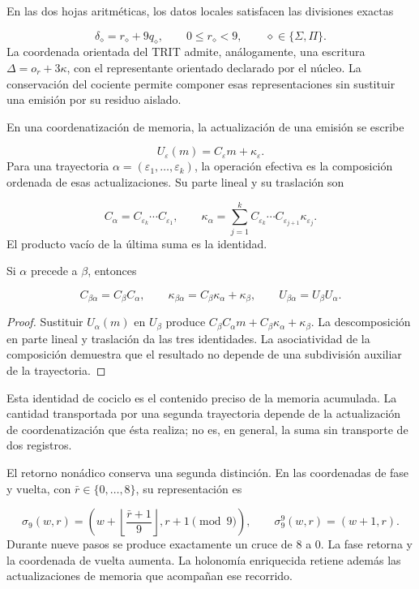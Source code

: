 En las dos hojas aritméticas, los datos locales satisfacen las divisiones exactas

\[
\delta_\diamond=r_\diamond+9q_\diamond,
\qquad 0\leq r_\diamond<9,
\qquad \diamond\in\{\Sigma,\Pi\}.
\]
La coordenada orientada del TRIT admite, análogamente, una escritura \(\Delta=o_r+3\kappa\), con el representante orientado declarado por el núcleo. La conservación del cociente permite componer esas representaciones sin sustituir una emisión por su residuo aislado.

En una coordenatización de memoria, la actualización de una emisión se escribe

\[
U_\varepsilon(m)=C_\varepsilon m+\kappa_\varepsilon.
\]
Para una trayectoria \(\alpha=(\varepsilon_1,\ldots,\varepsilon_k)\), la operación efectiva es la composición ordenada de esas actualizaciones. Su parte lineal y su traslación son

\[
C_\alpha=C_{\varepsilon_k}\cdots C_{\varepsilon_1},
\qquad
\kappa_\alpha=
\sum_{j=1}^{k}C_{\varepsilon_k}\cdots
C_{\varepsilon_{j+1}}\kappa_{\varepsilon_j}.
\]
El producto vacío de la última suma es la identidad.

\begin{proposition}
\label{prop:continuo-compatibilidad-afin}
Si \(\alpha\) precede a \(\beta\), entonces

\[
C_{\beta\alpha}=C_\beta C_\alpha,
\qquad
\kappa_{\beta\alpha}=C_\beta\kappa_\alpha+\kappa_\beta,
\qquad
U_{\beta\alpha}=U_\beta U_\alpha.
\]
\end{proposition}
\begin{proof}
Sustituir \(U_\alpha(m)\) en \(U_\beta\) produce \(C_\beta C_\alpha m+C_\beta\kappa_\alpha+\kappa_\beta\). La descomposición en parte lineal y traslación da las tres identidades. La asociatividad de la composición demuestra que el resultado no depende de una subdivisión auxiliar de la trayectoria.
\end{proof}

Esta identidad de cociclo es el contenido preciso de la memoria acumulada. La cantidad transportada por una segunda trayectoria depende de la actualización de coordenatización que ésta realiza; no es, en general, la suma sin transporte de dos registros.

El retorno nonádico conserva una segunda distinción. En las coordenadas de fase y vuelta, con \(\bar r\in\{0,\ldots,8\}\), su representación es

\[
\sigma_9(w,r)=
\left(w+\left\lfloor\frac{\bar r+1}{9}\right\rfloor,
r+1\pmod9\right),
\qquad
\sigma_9^9(w,r)=(w+1,r).
\]
Durante nueve pasos se produce exactamente un cruce de \(8\) a \(0\). La fase retorna y la coordenada de vuelta aumenta. La holonomía enriquecida retiene además las actualizaciones de memoria que acompañan ese recorrido.

